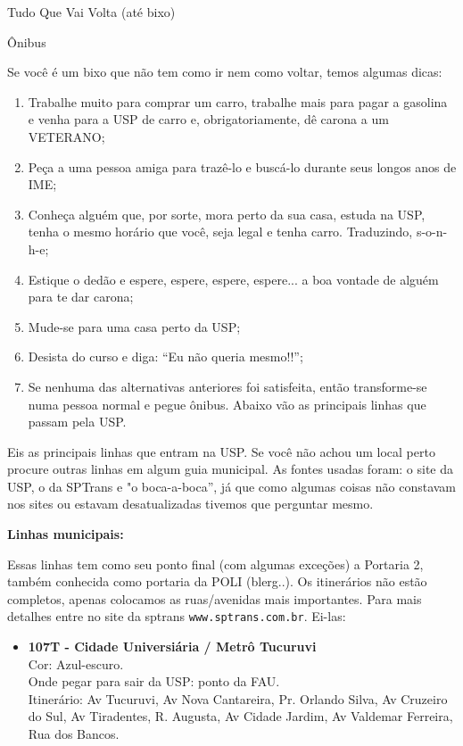 \begin{secao}{Tudo Que Vai Volta (até bixo)}

\begin{subsecao}{Ônibus}

Se você é um bixo que não tem como ir nem como voltar, temos algumas dicas:

\begin{enumerate}
  \item Trabalhe muito para comprar um carro,
  trabalhe mais para pagar a gasolina e
  venha para a USP de carro e, obrigatoriamente, dê carona a um VETERANO;

  \item Peça a uma pessoa amiga para trazê-lo e buscá-lo durante seus
  longos anos de IME;

  \item Conheça alguém que, por sorte, mora perto da sua casa, estuda na USP,
  tenha o mesmo horário que você, seja legal e tenha carro. Traduzindo, s-o-n-h-e;

  \item Estique o dedão e espere, espere, espere, espere... a boa vontade
  de alguém para te dar carona;

  \item Mude-se para uma casa perto da USP;

  \item Desista do curso e diga: ``Eu não queria mesmo!!'';

  \item Se nenhuma das alternativas anteriores foi satisfeita, então
  transforme-se numa pessoa normal e pegue ônibus. Abaixo vão as
  principais linhas que passam pela USP.
\end{enumerate}

Eis as principais linhas que entram na USP. Se você não achou um local perto procure outras linhas em algum guia municipal. As fontes usadas foram: o site da USP, o da SPTrans e "o boca-a-boca”, já que como algumas coisas não constavam nos sites ou estavam desatualizadas tivemos que perguntar mesmo. 

{\bf Linhas municipais:}

Essas linhas tem como seu ponto final (com algumas exceções) a Portaria 2,
também conhecida como portaria da POLI (blerg..). Os itinerários não estão completos,
apenas colocamos as ruas/avenidas mais importantes. Para mais detalhes entre no site
da sptrans {\tt www.sptrans.com.br}.
Ei-las:


\begin{itemize}
  \item {\bf 107T - Cidade Universiária / Metrô Tucuruvi}\\
    Cor: Azul-escuro.\\
    Onde pegar para sair da USP: ponto da FAU.\\
    Itinerário: Av Tucuruvi, Av Nova Cantareira, Pr. Orlando Silva, Av Cruzeiro do Sul,
	Av Tiradentes, R. Augusta, Av Cidade Jardim, Av Valdemar Ferreira, Rua dos Bancos.
  

\end{itemize}
\end{subsecao}
\end{secao}
